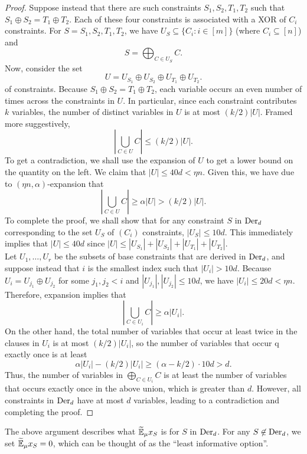	\begin{proof}
		Suppose instead that there are such constraints $S_1,S_2,T_1,T_2$ such that $S_1 \oplus S_2 = T_1 \oplus T_2$. Each of these four constraints is associated with a XOR of $C_i$ constraints. For $S = S_1,S_2,T_1,T_2$, we have $U_S \subseteq \{C_i : i \in [m]\}$ (where $C_i \subseteq [n]$) and
		\[ S = \bigoplus_{C \in U_{S}} C. \]
		Now, consider the set
		\[ U = U_{S_1} \oplus U_{S_2} \oplus U_{T_1} \oplus U_{T_2}. \]
		of constraints. Because $S_1 \oplus S_2 = T_1 \oplus T_2$, each variable occurs an even number of times across the constraints in $U$. In particular, since each constraint contributes $k$ variables, the number of distinct variables in $U$ is at most $(k/2) |U|$. Framed more suggestively,
		\[ \left| \bigcup_{C \in U} C \right| \le (k/2) |U|. \]
		To get a contradiction, we shall use the expansion of $U$ to get a lower bound on the quantity on the left. We claim that $|U| \le 40d < \eta n$. Given this, we have due to $(\eta n, \alpha)$-expansion that
		\[ \left| \bigcup_{C \in U} C \right| \ge \alpha |U| > (k/2) |U|. \]
		To complete the proof, we shall show that for any constraint $S$ in $\operatorname{Der}_d$ corresponding to the set $U_S$ of $(C_i)$ constraints, $|U_S| \le 10d$. This immediately implies that $|U| \le 40d$ since $|U| \le |U_{S_1}| + |U_{S_2}| + |U_{T_1}| + |U_{T_2}|$.\\
		Let $U_1,\ldots,U_r$ be the subsets of base constraints that are derived in $\operatorname{Der}_d$, and suppose instead that $i$ is the smallest index such that $|U_i| > 10d$. Because $U_i = U_{j_1} \oplus U_{j_2}$ for some $j_1,j_2 < i$ and $|U_{j_1}|,|U_{j_2}| \le 10d$, we have $|U_i| \le 20d < \eta n$. Therefore, expansion implies that
		\[ \left| \bigcup_{C \in U_i} C \right| \ge \alpha |U_i|. \]
		On the other hand, the total number of variables that occur at least twice in the clauses in $U_i$ is at most $(k/2) |U_i|$, so the number of variables that occur q exactly once is at least
		\[ \alpha |U_i| - (k/2) |U_i| \ge (\alpha - k/2) \cdot 10d > d. \]
		Thus, the number of variables in $\bigoplus_{C \in U_i} C$ is at least the number of variables that occurs exactly once in the above union, which is greater than $d$. However, all constraints in $\operatorname{Der}_d$ have at most $d$ variables, leading to a contradiction and completing the proof.
	\end{proof}

	The above argument describes what $\widetilde{\mathbb{E}}_\mu x_S$ is for $S$ in $\operatorname{Der}_d$. For any $S \not\in \operatorname{Der}_d$, we set $\widetilde{\mathbb{E}}_\mu x_S = 0$, which can be thought of as the ``least informative option''.\\

